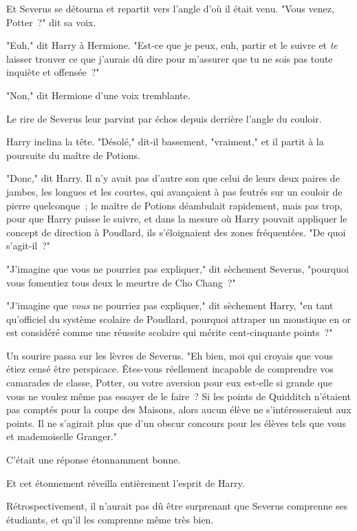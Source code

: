 Et Severus se détourna et repartit vers l'angle d'où il était venu. "Vous venez, Potter~?" dit sa voix.

"Euh," dit Harry à Hermione. "Est-ce que je peux, euh, partir et le suivre et \emph{te} laisser trouver ce que j'aurais dû dire pour m'assurer que tu ne sois pas toute inquiète et offensée~?"

"Non," dit Hermione d'une voix tremblante.

Le rire de Severus leur parvint par échos depuis derrière l'angle du couloir.

Harry inclina la tête. "Désolé," dit-il bassement, "vraiment," et il partit à la poursuite du maître de Potions.

\later

"Donc," dit Harry. Il n'y avait pas d'autre son que celui de leurs deux paires de jambes, les longues et les courtes, qui avançaient à pas feutrés sur un couloir de pierre quelconque~; le maître de Potions déambulait rapidement, mais pas trop, pour que Harry puisse le suivre, et dans la mesure où Harry pouvait appliquer le concept de direction à Poudlard, ils s'éloignaient des zones fréquentées. "De quoi s'agit-il~?"

"J'imagine que vous ne pourriez pas expliquer," dit sèchement Severus, "pourquoi vous fomentiez tous deux le meurtre de Cho Chang~?"

"J'imagine que \emph{vous} ne pourriez pas expliquer," dit sèchement Harry, "en tant qu'officiel du système scolaire de Poudlard, pourquoi attraper un moustique en or est considéré comme une réussite scolaire qui mérite cent-cinquante points~?"

Un sourire passa sur les lèvres de Severus. "Eh bien, moi qui croyais que vous étiez censé être perspicace. Êtes-vous réellement incapable de comprendre vos camarades de classe, Potter, ou votre aversion pour eux est-elle si grande que vous ne voulez même pas essayer de le faire~? Si les points de Quidditch n'étaient pas comptés pour la coupe des Maisons, alors aucun élève ne s'intéresseraient aux points. Il ne s'agirait plus que d'un obscur concours pour les élèves tels que vous et mademoiselle Granger."

C'était une réponse étonnamment bonne.

Et cet étonnement réveilla entièrement l'esprit de Harry.

Rétrospectivement, il n'aurait pas dû être surprenant que Severus comprenne ses étudiants, et qu'il les comprenne même très bien.

